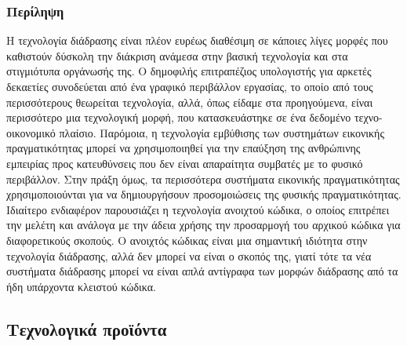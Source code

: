 \documentclass[
]{article}
\begin{document}
\hypertarget{ux3c0ux3b5ux3c1ux3afux3bbux3b7ux3c8ux3b7}{%
\subsubsection{Περίληψη}\label{ux3c0ux3b5ux3c1ux3afux3bbux3b7ux3c8ux3b7}}

Η τεχνολογία διάδρασης είναι πλέον ευρέως διαθέσιμη σε κάποιες λίγες
μορφές που καθιστούν δύσκολη την διάκριση ανάμεσα στην βασική τεχνολογία
και στα στιγμιότυπα οργάνωσής της. Ο δημοφιλής επιτραπέζιος υπολογιστής
για αρκετές δεκαετίες συνοδεύεται από ένα γραφικό περιβάλλον εργασίας,
το οποίο από τους περισσότερους θεωρείται τεχνολογία, αλλά, όπως είδαμε
στα προηγούμενα, είναι περισσότερο μια τεχνολογική μορφή, που
κατασκευάστηκε σε ένα δεδομένο τεχνο-οικονομικό πλαίσιο. Παρόμοια, η
τεχνολογία εμβύθισης των συστημάτων εικονικής πραγματικότητας μπορεί να
χρησιμοποιηθεί για την επαύξηση της ανθρώπινης εμπειρίας προς
κατευθύνσεις που δεν είναι απαραίτητα συμβατές με το φυσικό περιβάλλον.
Στην πράξη όμως, τα περισσότερα συστήματα εικονικής πραγματικότητας
χρησιμοποιούνται για να δημιουργήσουν προσομοιώσεις της φυσικής
πραγματικότητας. Ιδιαίτερο ενδιαφέρον παρουσιάζει η τεχνολογία ανοιχτού
κώδικα, ο οποίος επιτρέπει την μελέτη και ανάλογα με την άδεια χρήσης
την προσαρμογή του αρχικού κώδικα για διαφορετικούς σκοπούς. Ο ανοιχτός
κώδικας είναι μια σημαντική ιδιότητα στην τεχνολογία διάδρασης, αλλά δεν
μπορεί να είναι ο σκοπός της, γιατί τότε τα νέα συστήματα διάδρασης
μπορεί να είναι απλά αντίγραφα των μορφών διάδρασης από τα ήδη υπάρχοντα
κλειστού κώδικα.

\hypertarget{ux3c4ux3b5ux3c7ux3bdux3bfux3bbux3bfux3b3ux3b9ux3baux3ac-ux3c0ux3c1ux3bfux3caux3ccux3bdux3c4ux3b1}{%
\subsection{Τεχνολογικά
προϊόντα}\label{ux3c4ux3b5ux3c7ux3bdux3bfux3bbux3bfux3b3ux3b9ux3baux3ac-ux3c0ux3c1ux3bfux3caux3ccux3bdux3c4ux3b1}}
\end{document}
